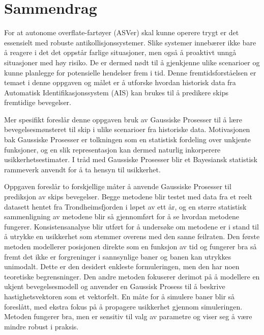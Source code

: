 \chapter*{Sammendrag}
For at autonome overflate-fartøyer (ASVer) skal kunne operere trygt er det essensielt med robuste antikollisjonssystemer. Slike systemer innebærer ikke bare å reagere i det det oppstår farlige situasjoner, men også å proaktivt unngå situasjoner med høy risiko. De er dermed nødt til å gjenkjenne ulike scenarioer og kunne planlegge for potensielle hendelser frem i tid. Denne fremtidsforståelsen er temaet i denne oppgaven og målet er å utforske hvordan historisk data fra Automatisk Identifikasjonssystem (AIS) kan brukes til å predikere skips fremtidige bevegelser.

Mer spesifikt foreslår denne oppgaven bruk av Gaussiske Prosesser til å lære bevegelsesmønsteret til skip i ulike scenarioer fra historiske data. Motivasjonen bak Gaussiske Prosesser er tolkningen som en statistisk fordeling over unkjente funksjoner, og en slik representasjon kan dermed naturlig inkorperere usikkerhetsestimater. I tråd med Gaussiske Prosesser blir et Bayesiansk statistisk rammeverk anvendt for å ta hensyn til usikkerhet.

Oppgaven foreslår to forskjellige måter å anvende Gaussiske Prosesser til prediksjon av skips bevegelser. Begge metodene blir testet med data fra et reelt datasett hentet fra Trondheimsfjorden i løpet av ett år, og en større statistisk sammenligning av metodene blir så gjennomført for å se hvordan metodene fungerer. Konsistensanalyse blir utført for å undersøke om metodene er i stand til å utrykke en usikkerhet som stemmer overens med den sanne feilraten.  
Den første metoden modellerer posisjonen direkte som en funksjon av tid og fungerer bra så fremt det ikke er forgreninger i sannsynlige baner og banen kan utrykkes unimodalt. Dette er den desidert enkleste formuleringen, men den har noen teoretiske begrensninger.
Den andre metoden fokuserer derimot på å modellere en ukjent bevegelsesmodell og anvender en Gaussisk Prosess til å beskrive hastighetsvektoren som et vektorfelt. En måte for å simulere baner blir så foreslått, med ekstra fokus på å propagere usikkerhet gjennom simuleringen. Metoden fungerer bra, men er sensitiv til valg av parametre og viser seg å være mindre robust i praksis. 







